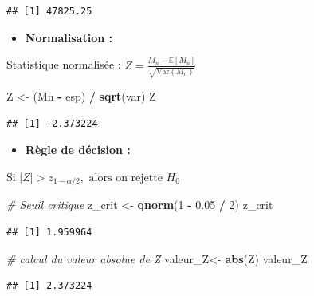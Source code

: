 \documentclass[
  12pt,
]{article}
\newenvironment{Shaded}{\begin{snugshade}}{\end{snugshade}}
\newcommand{\CommentTok}[1]{\textcolor[rgb]{0.56,0.35,0.01}{\textit{#1}}}
\newcommand{\DecValTok}[1]{\textcolor[rgb]{0.00,0.00,0.81}{#1}}
\newcommand{\FloatTok}[1]{\textcolor[rgb]{0.00,0.00,0.81}{#1}}
\newcommand{\FunctionTok}[1]{\textcolor[rgb]{0.13,0.29,0.53}{\textbf{#1}}}
\newcommand{\NormalTok}[1]{#1}
\newcommand{\OtherTok}[1]{\textcolor[rgb]{0.56,0.35,0.01}{#1}}
\newcommand{\SpecialCharTok}[1]{\textcolor[rgb]{0.81,0.36,0.00}{\textbf{#1}}}
\providecommand{\tightlist}{%
  \setlength{\itemsep}{0pt}\setlength{\parskip}{0pt}}
\begin{document}
\begin{verbatim}
## [1] 47825.25
\end{verbatim}

\begin{itemize}
\tightlist
\item
  \textbf{Normalisation : }
\end{itemize}

Statistique normalisée :
\(Z = \frac{M_n - \mathbb{E}[M_n]}{\sqrt{\mathrm{Var}(M_n)}}\)

\begin{Shaded}
\begin{Highlighting}[]
\NormalTok{Z }\OtherTok{\textless{}{-}}\NormalTok{ (Mn }\SpecialCharTok{{-}}\NormalTok{ esp) }\SpecialCharTok{/} \FunctionTok{sqrt}\NormalTok{(var)}
\NormalTok{Z}
\end{Highlighting}
\end{Shaded}

\begin{verbatim}
## [1] -2.373224
\end{verbatim}

\begin{itemize}
\tightlist
\item
  \textbf{Règle de décision : }
\end{itemize}

\(\text{Si } |Z| > z_{1 - \alpha/2}, \text{ alors on rejette } H_0\)

\begin{Shaded}
\begin{Highlighting}[]
\CommentTok{\# Seuil critique}
\NormalTok{  z\_crit }\OtherTok{\textless{}{-}} \FunctionTok{qnorm}\NormalTok{(}\DecValTok{1} \SpecialCharTok{{-}} \FloatTok{0.05} \SpecialCharTok{/} \DecValTok{2}\NormalTok{)}
\NormalTok{z\_crit}
\end{Highlighting}
\end{Shaded}

\begin{verbatim}
## [1] 1.959964
\end{verbatim}

\begin{Shaded}
\begin{Highlighting}[]
\CommentTok{\# calcul du valeur absolue de Z}
\NormalTok{valeur\_Z}\OtherTok{\textless{}{-}} \FunctionTok{abs}\NormalTok{(Z) }
\NormalTok{valeur\_Z}
\end{Highlighting}
\end{Shaded}

\begin{verbatim}
## [1] 2.373224
\end{verbatim}
\end{document}
